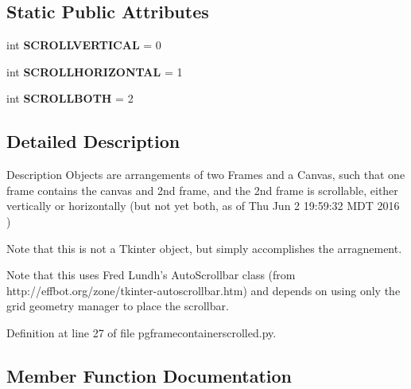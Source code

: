 \subsection*{Static Public Attributes}
\begin{DoxyCompactItemize}
\item 
int {\bfseries S\+C\+R\+O\+L\+L\+V\+E\+R\+T\+I\+C\+AL} = 0\hypertarget{classnegui_1_1pgframecontainerscrolled_1_1FrameContainerScrolled_a9f8fc6bb77d2973ee318f146b2da7faf}{}\label{classnegui_1_1pgframecontainerscrolled_1_1FrameContainerScrolled_a9f8fc6bb77d2973ee318f146b2da7faf}

\item 
int {\bfseries S\+C\+R\+O\+L\+L\+H\+O\+R\+I\+Z\+O\+N\+T\+AL} = 1\hypertarget{classnegui_1_1pgframecontainerscrolled_1_1FrameContainerScrolled_a9892a6bde66588412759262fb7d10f95}{}\label{classnegui_1_1pgframecontainerscrolled_1_1FrameContainerScrolled_a9892a6bde66588412759262fb7d10f95}

\item 
int {\bfseries S\+C\+R\+O\+L\+L\+B\+O\+TH} = 2\hypertarget{classnegui_1_1pgframecontainerscrolled_1_1FrameContainerScrolled_a6b07c9a74064e855296e4f9289b5b765}{}\label{classnegui_1_1pgframecontainerscrolled_1_1FrameContainerScrolled_a6b07c9a74064e855296e4f9289b5b765}

\end{DoxyCompactItemize}


\subsection{Detailed Description}
\begin{DoxyVerb}Description
Objects are arrangements of two Frames and a 
Canvas, such that one frame contains the 
canvas and 2nd frame, and the 2nd frame 
is scrollable, either vertically or horizontally 
(but not yet both, as of Thu Jun  2 19:59:32 MDT 2016 )


Note that this is not a Tkinter object, but
simply accomplishes the arragnement. 

Note that this uses Fred Lundh's AutoScrollbar class
(from http://effbot.org/zone/tkinter-autoscrollbar.htm)
and depends on using only the grid geometry manager to place
the scrollbar.
\end{DoxyVerb}
 

Definition at line 27 of file pgframecontainerscrolled.\+py.



\subsection{Member Function Documentation}
